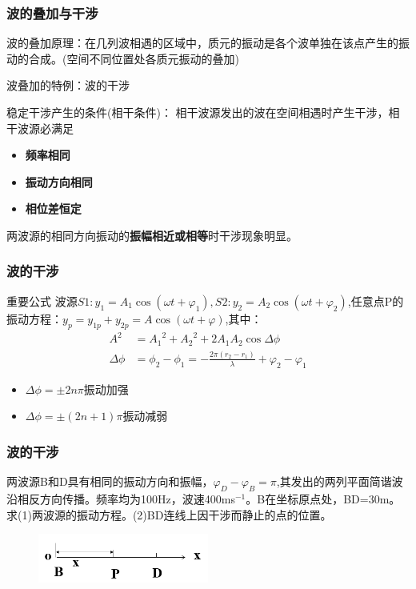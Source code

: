 \documentclass[UTF8]{ctexbeamer}
\begin{document}
\begin{frame}
\frametitle{波的叠加与干涉}
	波的叠加原理：在几列波相遇的区域中，质元的振动是各个波单独在该点产生的振动的合成。(空间不同位置处各质元振动的叠加)
	
	波叠加的特例：波的干涉
	
	稳定干涉产生的条件(相干条件)：
	相干波源发出的波在空间相遇时产生干涉，相干波源必满足
	\begin{itemize}
		\setlength{\itemsep}{0pt}
		\setlength{\parsep}{0pt}
		\setlength{\parskip}{0pt}
		\item \textbf{频率相同}
		\item \textbf{振动方向相同}
		\item \textbf{相位差恒定}
	\end{itemize}
	两波源的相同方向振动的\textbf{振幅相近或相等}时干涉现象明显。
\end{frame}
\begin{frame}
	\frametitle{波的干涉}
\begin{block}{重要公式}
	波源$S1:y_1=A_1\cos(\omega t+\varphi_1),S2:y_2=A_2\cos(\omega t+\varphi_2)$,任意点P的振动方程：$y_p=y_{1p}+y_{2p}=A\cos(\omega t+\varphi)$,其中：
	$$\begin{aligned}A^2&={A_1}^2+{A_2}^2+2A_1A_2\cos \Delta\phi\\
	\Delta\phi&=\phi_2-\phi_1=-\frac{2\pi(r_2-r_1)}\lambda+\varphi_2-\varphi_1\end{aligned}$$
\end{block}
\begin{itemize}
	\item $\Delta\phi=\pm2n\pi $振动加强
	\item $\Delta\phi=\pm(2n+1)\pi $振动减弱
\end{itemize}
\end{frame}
\begin{frame}
\frametitle{波的干涉}
\begin{examples}
	两波源B和D具有相同的振动方向和振幅，$\varphi_D-\varphi_B=\pi$,其发出的两列平面简谐波沿相反方向传播。频率均为100Hz，波速400ms$^{-1}$。B在坐标原点处，BD=30m。求(1)两波源的振动方程。(2)BD连线上因干涉而静止的点的位置。
	\begin{figure}[!ht]
		\centering
		\includegraphics[width=0.5\textwidth]{6}
	\end{figure}
\end{examples}
  \end{frame}
\end{document}
